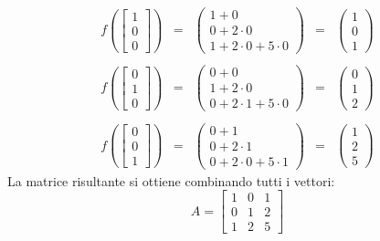 \documentclass[a4paper]{article}
\begin{document}
	\begin{equation*}
		\begin{array}{lllll}
			f\left(\begin{bmatrix}
				1 \\
				0 \\
				0
			\end{bmatrix}\right) & = & \begin{pmatrix}
				1 + 0 	\\
				0 + 2 \cdot 0 	\\
				1 + 2 \cdot 0 + 5 \cdot 0
			\end{pmatrix} & = & \begin{pmatrix}
				1 \\
				0 \\
				1
			\end{pmatrix} \\
			\\
			f\left(\begin{bmatrix}
				0 \\
				1 \\
				0
			\end{bmatrix}\right) & = & \begin{pmatrix}
				0 + 0 	\\
				1 + 2 \cdot 0 	\\
				0 + 2 \cdot 1 + 5 \cdot 0
			\end{pmatrix} & = & \begin{pmatrix}
				0 \\
				1 \\
				2
			\end{pmatrix} \\
			\\
			f\left(\begin{bmatrix}
				0 \\
				0 \\
				1
			\end{bmatrix}\right) & = & \begin{pmatrix}
				0 + 1 	\\
				0 + 2 \cdot 1 	\\
				0 + 2 \cdot 0 + 5 \cdot 1
			\end{pmatrix} & = & \begin{pmatrix}
				1 \\
				2 \\
				5
			\end{pmatrix}
		\end{array}
	\end{equation*}
	La matrice risultante si ottiene combinando tutti i vettori:
	\begin{equation*}
		A = \begin{bmatrix}
			1 & 0 & 1 \\
			0 & 1 & 2 \\
			1 & 2 & 5
		\end{bmatrix}
	\end{equation*}\newpage
	
\end{document}
